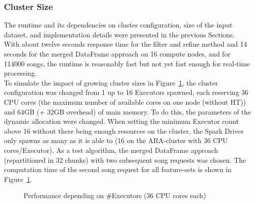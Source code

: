 \subsubsection{Cluster Size}

\noindent The runtime and its dependencies on cluster configuration, size of the input dataset, and implementation details were presented in the previous Sections. With about twelve seconds response time for the filter and refine method and 14 seconds for the merged DataFrame approach on 16 compute nodes, and for 114000 songs, the runtime is reasonably fast but not yet fast enough for real-time processing.\\ 
\noindent To simulate the impact of growing cluster sizes in Figure~\ref{perfspark6}, the cluster configuration was changed from 1 up to 16 Executors spawned, each reserving 36 CPU cores (the maximum number of available cores on one node (without HT)) and 64GB (+ 32GB overhead) of main memory. To do this, the parameters of the dynamic allocation were changed. When setting the minimum Executor count above 16 without there being enough resources on the cluster, the Spark Driver only spawns as many as it is able to (16 on the ARA-cluster with 36 CPU cores/Executor). As a test algorithm, the merged DataFrame approach (repartitioned in 32 chunks) with two subsequent song requests was chosen. The computation time of the second song request for all feature-sets is shown in Figure~\ref{perfspark6}.\\

\FloatBarrier
\begin{figure}[htbp]
   	\centering
   	\caption{Performance depending on \#Executors (36 CPU cores each)}
   	\label{perfspark6}
\end{figure}
\FloatBarrier

